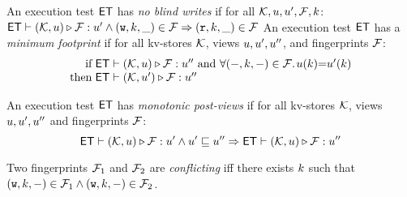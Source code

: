 \begin{definition}[$\ET$ properties]
\label{def:et_properties}
An execution test $\ET$ has \emph{no blind writes} if
for all $\mathcal{K}, u, u', \mathcal{F}, k$:\\
\indent
$
\mathsf{ET} \vdash (\mathcal{K}, u) \triangleright \mathcal{F}: u' 
\land (\textnormal{\texttt w}, k, \_) \in \mathcal{F}
\Rightarrow (\textnormal{\texttt r}, k, \_) \in \mathcal{F}
$
An execution test $\ET$ has a \emph{minimum footprint} if for all kv-stores $\mathcal{K}$,
views $u, u',u''$, and fingerprints $\mathcal{F}$: 
%
\[
\begin{array}{@{} r @{\hspace{3pt}} l @{}}
\text{if} & \ET \vdash (\hh, \vi) \triangleright \opset : \vi'' 
\text{ and } \fora{(\stub, \ke, \stub) \in \f}\!\! \vi(\ke) {=} \vi'(\ke) \\
\text{then} & \ET \vdash (\hh, \vi') \triangleright \opset : \vi''
\end{array} 
\]
%

An execution test $\ET$ has \emph{monotonic post-views} if 
for all kv-stores $\mathcal{K}$, 
views $u, u',u''$ and fingerprints $\mathcal{F}$:
\[
    \mathsf{ET} \vdash (\mathcal{K}, u) \triangleright \mathcal{F} : u' 
    \land u' \sqsubseteq u'' 
    \Rightarrow 
    \mathsf{ET} \vdash (\mathcal{K}, u) \triangleright \mathcal{F} : u''
\]

Two fingerprints $\mathcal{F}_1$ and $\mathcal{F}_2$ are \emph{conflicting} 
iff there exists $k$ such that 
$(\textnormal{\texttt w}, k, -) \in \mathcal{F}_1 \land (\textnormal{\texttt w}, k, -) \in \mathcal{F}_2$. 


\end{definition}
